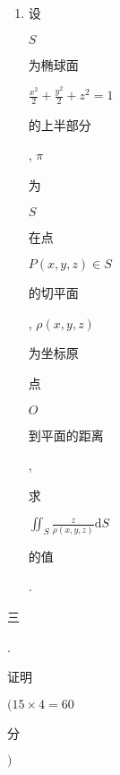\documentclass[10pt]{article}
\begin{document}
\begin{enumerate}
  \item \begin{CJK}{UTF8}{mj}设\end{CJK} $S$ \begin{CJK}{UTF8}{mj}为椭球面\end{CJK} $\frac{x^{2}}{2}+\frac{y^{2}}{2}+z^{2}=1$ \begin{CJK}{UTF8}{mj}的上半部分\end{CJK}, $\pi$ \begin{CJK}{UTF8}{mj}为\end{CJK} $S$ \begin{CJK}{UTF8}{mj}在点\end{CJK} $P(x, y, z) \in S$ \begin{CJK}{UTF8}{mj}的切平面\end{CJK}, $\rho(x, y, z)$ \begin{CJK}{UTF8}{mj}为坐标原\end{CJK} \begin{CJK}{UTF8}{mj}点\end{CJK} $O$ \begin{CJK}{UTF8}{mj}到平面的距离\end{CJK}, \begin{CJK}{UTF8}{mj}求\end{CJK} $\iint_{S} \frac{z}{\rho(x, y, z)} \mathrm{d} S$ \begin{CJK}{UTF8}{mj}的值\end{CJK}.

\end{enumerate}
\begin{CJK}{UTF8}{mj}三\end{CJK}. \begin{CJK}{UTF8}{mj}证明\end{CJK} $(15 \times 4=60$ \begin{CJK}{UTF8}{mj}分\end{CJK} $)$
\end{document}
